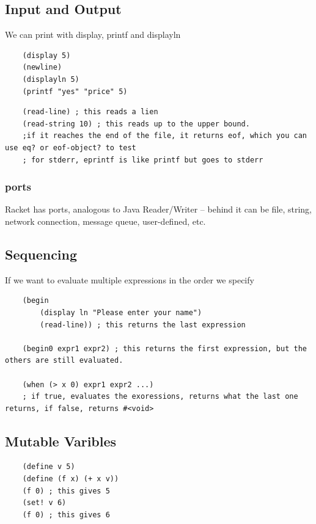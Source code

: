 \documentclass[12pt]{article}
\begin{document}
\subsection{Input and Output}

We can print with display, printf and displayln

\begin{lstlisting}
	(display 5)
	(newline)
	(displayln 5)
	(printf "yes" "price" 5)
\end{lstlisting}

\begin{lstlisting}
	(read-line) ; this reads a lien
	(read-string 10) ; this reads up to the upper bound.
	;if it reaches the end of the file, it returns eof, which you can use eq? or eof-object? to test
	; for stderr, eprintf is like printf but goes to stderr
\end{lstlisting}

\subsubsection{ports}

Racket has ports, analogous to Java Reader/Writer -- behind it can be file, string, network connection, message queue, user-defined, etc.

\subsection{Sequencing}

If we want to evaluate multiple expressions in the order we specify

\begin{lstlisting}
	(begin
		(display ln "Please enter your name")
		(read-line)) ; this returns the last expression

	(begin0 expr1 expr2) ; this returns the first expression, but the others are still evaluated.

	(when (> x 0) expr1 expr2 ...)
	; if true, evaluates the exoressions, returns what the last one returns, if false, returns #<void>
\end{lstlisting}

\subsection{Mutable Varibles}

\begin{lstlisting}
	(define v 5)
	(define (f x) (+ x v))
	(f 0) ; this gives 5
	(set! v 6)
	(f 0) ; this gives 6
\end{lstlisting}
\end{document}
